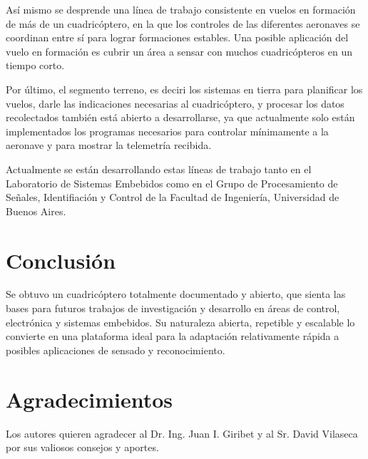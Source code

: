 \documentclass[a4paper, conference]{IEEEtran}
\begin{document}
Así mismo se desprende una línea de trabajo consistente en vuelos en formación de más de un cuadricóptero, en la que los controles de las diferentes aeronaves se coordinan entre sí para lograr formaciones estables. Una posible aplicación del vuelo en formación es cubrir un área a sensar con muchos cuadricópteros en un tiempo corto.

Por último, el segmento terreno, es deciri los sistemas en tierra para planificar los vuelos, darle las indicaciones necesarias al cuadricóptero, y procesar los datos recolectados también está abierto a desarrollarse, ya que actualmente solo están implementados los programas necesarios para controlar mínimamente a la aeronave y para mostrar la telemetría recibida.

Actualmente se están desarrollando estas líneas de trabajo tanto en el Laboratorio de Sistemas Embebidos como en el Grupo de Procesamiento de Señales, Identifiación y Control de la Facultad de Ingeniería, Universidad de Buenos Aires.

\vspace{5 mm}

\section*{Conclusión}

Se obtuvo un cuadricóptero totalmente documentado y abierto, que sienta las bases para futuros trabajos de investigación y desarrollo en áreas de control, electrónica y sistemas embebidos. 
Su naturaleza abierta, repetible y escalable lo convierte en una plataforma ideal  para la adaptación relativamente rápida a posibles aplicaciones de sensado y reconocimiento.

\vspace{5 mm}

\section*{Agradecimientos}
Los autores quieren agradecer al Dr. Ing. Juan I. Giribet y al Sr. David Vilaseca por sus valiosos consejos y aportes.

\vspace{5 mm}
\end{document}
